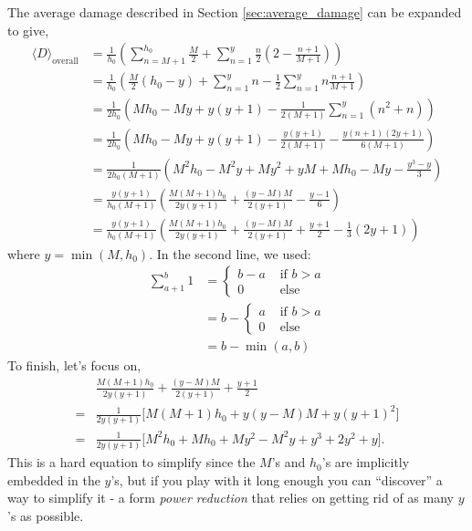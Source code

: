 \documentclass[../../main.tex]{subfiles}
\begin{document}
			The average damage described in Section \ref{sec:average_damage} can be expanded to give,
			\begin{align}
				\langle D \rangle_\text{overall} &= \frac{1}{h_0}\left(
					\sum_{n=M+1}^{h_{0}}\frac{M}{2} +
					\sum_{n=1}^{y} \frac{n}{2}\left(2 - \frac{n + 1}{M+1}\right)
				\right) \\
				&= \frac{1}{h_0}\left(
					\frac{M}{2}(h_0-y) +
					\sum_{n=1}^{y}n - \frac{1}{2}\sum_{n=1}^yn\frac{n + 1}{M+1}
				\right) \\
				&= \frac{1}{2h_0}\left(
					Mh_0-My + y(y+1)
					 - \frac{1}{2({M+1})}\sum_{n=1}^y(n^2 + n)
				\right) \\
				&= \frac{1}{2h_0}\left(
					Mh_0-My + y(y+1) - \frac{y(y+1)}{2({M+1})}
					 - \frac{y(n+1)(2y+1)}{6({M+1})}
				\right) \\
				&= \frac{1}{2h_0({M+1})}\left(
					M^{2}h_{0}-M^{2}y+My^{2}+yM+Mh_{0}-My - \frac{y^3-y}{3}
				\right) \\
				&= \frac{y(y+1)}{h_0({M+1})}\left(
					\frac{M(M+1)h_{0}}{2y(y+1)}+\frac{(y-M)M}{2(y+1)} - \frac{y-1}{6}
				\right) \\
				&= \frac{y(y+1)}{h_0({M+1})}\left(
					\frac{M(M+1)h_{0}}{2y(y+1)}+\frac{(y-M)M}{2(y+1)} +\frac{y+1}{2} -\frac{1}{3}(2y+1)
				\right)
				\label{eq:app-average-damage-original}
			\end{align}
			where $y=\min(M, h_0)$. In the second line, we used:
			\begin{align}
				\sum_{a+1}^b1&=\begin{cases}
						b-a&\text{ if } b>a\\
						0 &\text{ else }
					\end{cases}\\
					&=b-\begin{cases}
						a &\text{ if } b>a\\
						0 &\text{ else }
					\end{cases}\\
					&=b-\min(a, b)
			\end{align}
			To finish, let's focus on,
			\begin{align}
				 &\frac{M(M+1)h_{0}}{2y(y+1)}+\frac{(y-M)M}{2(y+1)} +\frac{y+1}{2} \\
				=&\frac{1}{2y(y+1)}\Big[ M(M+1)h_{0}+y(y-M)M +y(y+1)^2 \Big]\\
				=&\frac{1}{2y(y+1)}\Big[ M^2h_{0}+Mh_0+My^2-M^2y +y^3+2y^2+y \Big].\label{eq:app-average-damage-bracket}
			\end{align}
			This is a hard equation to simplify since the $M$'s and $h_0$'s are implicitly embedded in the $y$'s, but if you play with it long enough you can ``discover'' a way to simplify it - a form \textit{power reduction} that relies on getting rid of as many $y$'s as possible.
\end{document}
